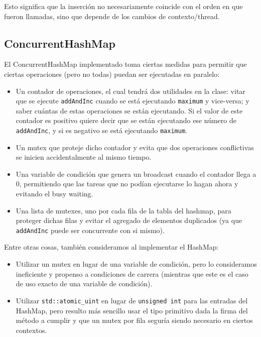 Esto significa que la inserción no necesariamente coincide con el orden en que fueron llamadas, sino que depende de los cambios de contexto/thread.

\subsection{ConcurrentHashMap}

El ConcurrentHashMap implementado toma ciertas medidas para permitir que ciertas operaciones (pero no todas) puedan ser ejecutadas en paralelo:

\begin{itemize}

	\item Un contador de operaciones, el cual tendrá dos utilidades en la clase: vitar que se ejecute \texttt{addAndInc} cuando se está ejecutando \texttt{maximum} y vice-versa; y saber cuántas de estas operaciones se están ejecutando. Si el valor de este contador es positivo quiere decir que se están ejecutando ese número de \texttt{addAndInc}, y si es negativo se está ejecutando \texttt{maximum}.

	\item Un mutex que proteje dicho contador y evita que dos operaciones conflictivas se inicien accidentalmente al mismo tiempo.

	\item Una variable de condición que genera un broadcast cuando el contador llega a 0, permitiendo que las tareas que no podían ejecutarse lo hagan ahora y evitando el busy waiting.

	\item Una lista de mutexes, uno por cada fila de la tabla del hashmap, para proteger dichas filas y evitar el agregado de elementos duplicados (ya que \texttt{addAndInc} puede ser concurrente con si mismo).

\end{itemize}

Entre otras cosas, también consideramos al implementar el HashMap:

\begin{itemize}

	\item Utilizar un mutex en lugar de una variable de condición, pero lo consideramos ineficiente y propenso a condiciones de carrera (mientras que este es el caso de uso exacto de una variable de condición).

	\item Utilizar \texttt{std::atomic\_uint} en lugar de \texttt{unsigned int} para las entradas del HashMap, pero resulto más sencillo usar el tipo primitivo dada la firma del método a cumplir y que un mutex por fila seguría siendo necesario en ciertos contextos.

\end{itemize}

